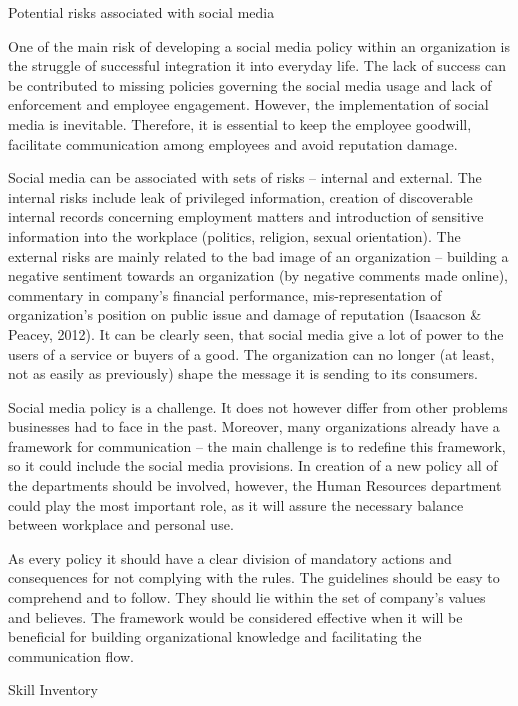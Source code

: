 \documentclass[a4paper,fleqn,11pt,dvips,titlepage]{article}
\numberwithin{figure}{section}
\numberwithin{equation}{section}
\begin{document}
Potential risks associated with social media

One of the main risk of developing a social media policy within an organization is the struggle of successful integration it into everyday life. The lack of success can be contributed to missing policies governing the social media usage and lack of enforcement and employee engagement. However, the implementation of social media is inevitable. Therefore, it is essential to keep the employee goodwill, facilitate communication among employees and avoid reputation damage. 

Social media can be associated with sets of risks – internal and external. The internal risks include leak of privileged information, creation of discoverable internal records concerning employment matters and introduction of sensitive information into the workplace (politics, religion, sexual orientation). The external risks are mainly related to the bad image of an organization – building a negative sentiment towards an organization (by negative comments made online), commentary in company’s financial performance, mis-representation of organization’s position on public issue and damage of reputation (Isaacson & Peacey, 2012). It can be clearly seen, that social media give a lot of power to the users of a service or buyers of a good. The organization can no longer (at least, not as easily as previously) shape the message it is sending to its consumers. 

Social media policy is a challenge. It does not however differ from other problems businesses had to face in the past. Moreover, many organizations already have a framework for communication – the main challenge is to redefine this framework, so it could include the social media provisions. In creation of a new policy all of the departments should be involved, however, the Human Resources department could play the most important role, as it will assure the necessary balance between workplace and personal use. 

As every policy it should have a clear division of mandatory actions and consequences for not complying with the rules. The guidelines should be easy to comprehend and to follow. They should lie within the set of company’s values and believes. The framework would be considered effective when it will be beneficial for building organizational knowledge and facilitating the communication flow. 

Skill Inventory
\end{document}
